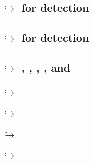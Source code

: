 \subsection{\hubMod{} $\hookrightarrow$ \wcpMod{} for \suxSH{} detection                                    \lispDone      {}} \label{hub: lookups: into wcp for stack underflow}             
\subsection{\hubMod{} $\hookrightarrow$ \wcpMod{} for \soxSH{} detection                                    \lispDone      {}} \label{hub: lookups: into wcp for stack overflow}              
\subsection{\hubMod{} $\hookrightarrow$ \addMod{}, \binMod{}, \modMod{}, \mulMod{}, \shfMod{} and \wcpMod{} \lispDone      {}} \label{hub: lookups: into the 2 argument stateless modules}    
\subsection{\hubMod{} $\hookrightarrow$ \extMod{}                                                           \lispDone      {}} \label{hub: lookups: into ext}                                 
\subsection{\hubMod{} $\hookrightarrow$ \btcMod{}                                                           \lispDone      {}} \label{hub: lookups: into block data}                          
\subsection{\hubMod{} $\hookrightarrow$ \blockHashMod{}                                                     \lispDone      {}} \label{hub: lookups: into block hash}                          
\subsection{\hubMod{} $\hookrightarrow$ \trmMod{}                                                           \lispDone      {}} \label{hub: lookups: into trm}                                 
